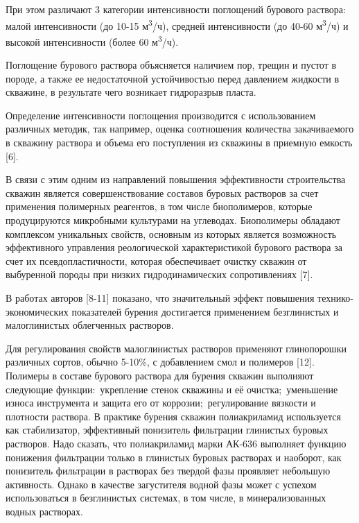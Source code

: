 \begin{multicols}{2}
При этом различают 3 категории интенсивности поглощений бурового
раствора: малой интенсивности (до 10-15 м\textsuperscript{3}/ч), средней
интенсивности (до 40-60 м\textsuperscript{3}/ч) и высокой интенсивности
(более 60 м\textsuperscript{3}/ч).

Поглощение бурового раствора объясняется наличием пор, трещин и пустот в
породе, а также ее недостаточной устойчивостью перед давлением жидкости
в скважине, в результате чего возникает гидроразрыв пласта.

Определение интенсивности поглощения производится с использованием
различных методик, так например, оценка соотношения количества
закачиваемого в скважину раствора и объема его поступления из скважины в
приемную емкость {[}6{]}.

В связи с этим одним из направлений повышения эффективности
строительства скважин является совершенствование составов буровых
растворов за счет применения полимерных реагентов, в том числе
биополимеров, которые продуцируются микробными культурами на углеводах.
Биополимеры обладают комплексом уникальных свойств, основным из которых
является возможность эффективного управления реологической
характеристикой бурового раствора за счет их псевдопластичности, которая
обеспечивает очистку скважин от выбуренной породы при низких
гидродинамических сопротивлениях {[}7{]}.~

В работах авторов {[}8-11{]} показано, что значительный эффект повышения
технико-экономических показателей бурения достигается применением
безглинистых и малоглинистых облегченных растворов.

Для регулирования свойств малоглинистых растворов применяют глинопорошки
различных сортов, обычно 5-10\%, с добавлением смол и полимеров
{[}12{]}. Полимеры в составе бурового раствора для бурения скважин
выполняют следующие функции:~укрепление стенок скважины и её
очистка;~уменьшение износа инструмента и защита его от
коррозии;~регулирование вязкости и плотности раствора. В практике
бурения скважин полиакриламид используется как стабилизатор, эффективный
понизитель фильтрации глинистых буровых растворов. Надо сказать, что
полиакриламид марки АК-636 выполняет функцию понижения фильтрации только
в глинистых буровых растворах и наоборот, как понизитель фильтрации в
растворах без твердой фазы проявляет небольшую активность. Однако в
качестве загустителя водной фазы может с успехом использоваться в
безглинистых системах, в том числе, в минерализованных водных растворах.


\end{multicols}
